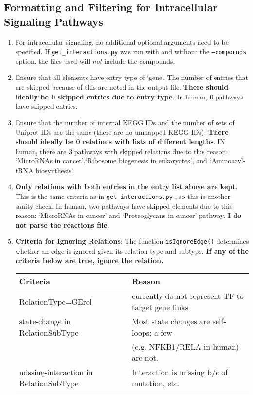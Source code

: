 \documentclass[10pt]{article}
\newcommand{\getinteractions}{\texttt{get\_interactions.py} }
\begin{document}
\subsection{Formatting and Filtering for Intracellular Signaling Pathways}

\begin{enumerate}
\item For intracellular signaling, no additional optional arguments need to be specified. If \getinteractions was run with and without the \texttt{--compounds} option, the files used will \emph{not} include the compounds.
\item Ensure that all elements have entry type of `gene'.  The number of entries that are skipped because of this are noted in the output file.  \textbf{There should ideally be 0 skipped entries due to entry type.} In human, 0 pathways have skipped entries.
\item Ensure that the number of internal KEGG IDs and the number of sets of Uniprot IDs are the same (there are no unmapped KEGG IDs).  \textbf{There should ideally be 0 relations with lists of different lengths}.  IN human, there are 3 pathways with skipped relations due to this reason: `MicroRNAs in cancer',`Ribosome biogenesis in eukaryotes', and `Aminoacyl-tRNA biosynthesis'.
\item \textbf{Only relations with both entries in the entry list above are kept.} This is the same criteria as in \getinteractions, so this is another sanity check.  In human, two pathways have skipped elements due to this reason: `MicroRNAs in cancer' and `Proteoglycans in cancer' pathway. \textbf{I do not parse the reactions file.}
\item \textbf{Criteria for Ignoring Relations}: The function \texttt{isIgnoreEdge()} determines whether an edge is ignored given its relation type and subtype. \textbf{If any of the criteria below are true, ignore the relation.} 
\begin{center}
\begin{tabular}{l|l}
\textbf{Criteria} & \textbf{Reason} \\ \hline
RelationType=GErel & currently do not represent TF to target gene links\\
state-change in RelationSubType & Most state changes are self-loops; a few \\
 & (e.g. NFKB1/RELA in human) are not.\\
missing-interaction in RelationSubType & Interaction is missing b/c of mutation, etc.\\

\end{tabular}
\end{center}
\end{enumerate}
\end{document}
